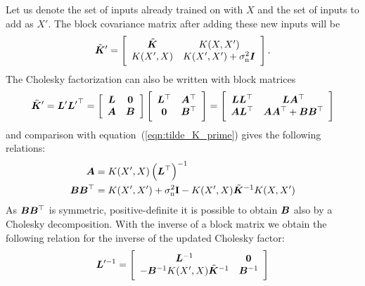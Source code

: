 Let us denote the set of inputs already trained on with $X$ and the set of 
inputs to add as $X'$. The block covariance matrix after adding these new inputs 
will be
\begin{equation} \label{eqn:tilde_K_prime}
    \tilde{\bm{K}}' = \left[ \begin{array}{cc}
            \tilde{\bm{K}} & K(X, X') \\ K(X', X) & K(X', X') 
            + \sigma_{\mathrm{n}}^2\bm{I}
        \end{array}
    \right]\text{.}
\end{equation}
The Cholesky factorization can also be written with block matrices
\begin{equation}
    \tilde{\bm{K}}' = \bm{L}' {\bm{L}'}^{\top} = \left[
        \begin{array}{cc}
            \bm{L} & \bm{0} \\ \bm{A} & \bm{B}
        \end{array}
    \right] \left[
        \begin{array}{cc}
            \bm{L}^{\top} & \bm{A}^{\top} \\ \bm{0} & \bm{B}^{\top}
        \end{array}
    \right] = \left[
        \begin{array}{cc}
            \bm{L} \bm{L}^{\top} & \bm{L} \bm{A}^{\top} \\ \bm{A} \bm{L}^{\top} & \bm{A} \bm{A}^{\top} + \bm{B} \bm{B}^{\top}
        \end{array}
    \right]
\end{equation}
and comparison with equation~(\ref{eqn:tilde_K_prime}) gives the following 
relations:
\begin{align}
    \mat A &= K(X', X) \del{\mat L\Tr}^{-1} \\
    \mat B \mat B\Tr &= K(X', X') + \sigma\ped{n}^2\mat{\mathrm{I}} - K(X', 
    X)\tilde{\mat{K}}^{-1}K(X, X')
\end{align}
As $\bm{B} \bm{B}^{\top}$ is symmetric, positive-definite it is possible to obtain 
$\bm{B}$ also by a Cholesky decomposition.
With the inverse of a block matrix \parencite[45]{Petersen:2008wc} we obtain the 
following relation for the inverse of the updated Cholesky factor:
\begin{equation}
    \bm{L}'^{-1} = \left[
        \begin{array}{cc}
            \bm{L}^{-1} & \bm{0} \\ -\bm{B}^{-1} K(X', X)\tilde{\bm{K}}^{-1} 
            & \bm{B}^{-1}
        \end{array}
    \right] \label{eqn:invChol}
\end{equation}

